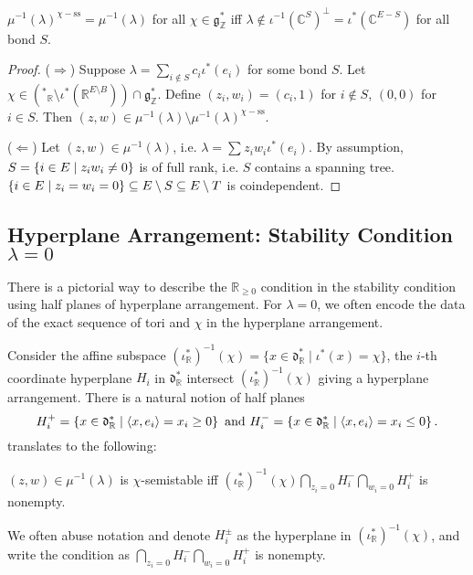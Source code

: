 \documentclass[b5paper]{article}
\newcommand{\mathintitle}[1]{\texorpdfstring{$#1$}{\detokenize{#1}}}
\newcommand{\del}{\setminus}
\newcommand{\sstab}{\mathrm{ss}}
\begin{document}
\begin{proposition}[pps:]{}
  $\mu^{-1}(\lambda)^{\chi-\sstab}=\mu^{-1}(\lambda)$ for all $\chi\in \mathfrak{g}^*_{\mathbb{Z}}$ iff $\lambda\notin \iota^{-1}(\mathbb{C}^S)^\perp=\iota^*(\mathbb{C}^{E-S})$ for all bond $S$.
  \begin{proof}
    ($\Rightarrow $) Suppose $\lambda=\sum_{i\notin S}^{}c_i\iota^*(e_i)$ for some bond $S$. Let $\chi\in (\mathfrak{^*}_\mathbb{R}\setminus \iota^*(\mathbb{R}^{E\del B})) \cap \mathfrak{g}^*_\mathbb{Z}$. Define $(z_i,w_i)=(c_i,1)$ for $i\notin S$, $(0,0)$ for $i\in S$. Then $(z,w)\in \mu^{-1}(\lambda)\setminus \mu^{-1}(\lambda)^{\chi-\sstab}$.

    ($\Leftarrow $) Let $(z,w)\in \mu^{-1}(\lambda)$, i.e. $\lambda=\sum_{}^{}z_iw_i\iota^*(e_i)$. By assumption, $S=\left\{i\in E\mid z_iw_i\neq 0\right\}$ is of full rank, i.e. $S$ contains a spanning tree. $\CB{i\in E\mid z_i=w_i=0}\subseteq E\del S\subseteq E\del T$ is coindependent.
  \end{proof}
\end{proposition}

\subsection{Hyperplane Arrangement: Stability Condition \mathintitle{\lambda=0}}

There is a pictorial way to describe the $\mathbb{R}_{\geq 0}$ condition in the stability condition using half planes of hyperplane arrangement.
For $\lambda=0$, we often encode the data of the exact sequence of tori and $\chi$ in the hyperplane arrangement. 

Consider the affine subspace $ (\iota_{\mathbb{R}}^*)^{-1}(\chi) = \{ x \in \mathfrak{d}_{\mathbb{R}}^* \mid \iota^*(x) = \chi \} $, the $i$-th coordinate hyperplane $H_i$ in $\mathfrak{d}_\mathbb{R}^*$ intersect $(\iota_{\mathbb{R}}^*)^{-1}(\chi)$ giving a hyperplane arrangement. There is a natural notion of half planes 
\[
H_i^+=\left\{x\in \mathfrak{d}^*_\mathbb{R}\mid \langle x,e_i\rangle=x_i\geq 0\right\}
\textnormal{ and }
H_i^-=\left\{x\in \mathfrak{d}^*_\mathbb{R}\mid \langle x,e_i\rangle=x_i\leq 0\right\}.
\]
 translates to the following:

\begin{lemma}[lem:]{}
  $(z,w)\in \mu^{-1}(\lambda)$ is $\chi$-semistable iff $(\iota_{\mathbb{R}}^*)^{-1}(\chi)\bigcap _{z_i=0}H_i^-\bigcap _{w_i=0}H_i^+$ is nonempty. 
  \begin{remark}
    We often abuse notation and denote $H_i^{\pm}$ as the hyperplane in $(\iota^*_{\mathbb{R}})^{-1}(\chi)$, and write the condition as $\bigcap _{z_i=0}H_i^-\bigcap _{w_i=0}H_i^+$ is nonempty. 
  \end{remark}
\end{lemma}
\end{document}
